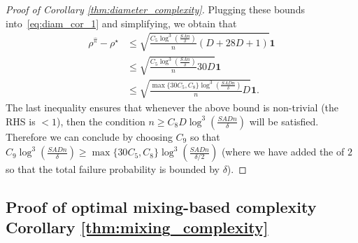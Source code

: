 \documentclass{article}
\theoremstyle{plain}
\theoremstyle{plain}
\theoremstyle{remark}
\theoremstyle{plain}
\theoremstyle{plain}
\newcommand{\one}{\mathbf{1}}
\newcommand{\pihat}{\widehat{\pi}}
\begin{document}
\begin{proof}[Proof of Corollary \ref{thm:diameter_complexity}]
    Plugging these bounds into~\eqref{eq:diam_cor_1} and simplifying, we obtain that
    \begin{align*}
        \rho^{\pihat} - \rho^\star & \leq  \sqrt{\frac{C_5 \log^3 \left( \frac{SAn}{\delta} \right)}{n} \left( D + 28 D + 1 \right) }\one \\
        & \leq  \sqrt{\frac{C_5 \log^3 \left( \frac{SAn}{\delta} \right)}{n} 30 D }\one \\
        & \leq  \sqrt{\frac{\max \{30 C_5, C_8 \} \log^3 \left( \frac{SADn}{\delta} \right)}{n}  D }\one.
    \end{align*}
    The last inequality ensures that whenever the above bound is non-trivial (the RHS is $< 1$), then the condition $n \geq C_8 D \log^3 \left(\frac{SADn}{\delta} \right)$ will be satisfied. Therefore we can conclude by choosing $C_9$ so that $C_9  \log^3 \left( \frac{SADn}{\delta} \right) \geq \max \{30 C_5, C_8 \} \log^3 \left( \frac{SADn}{\delta/2} \right)$ (where we have added the of $2$ so that the total failure probability is bounded by $\delta$).
    
\end{proof}


\subsection{Proof of optimal mixing-based complexity Corollary \ref{thm:mixing_complexity}}
\label{sec:mixing_complexity_thm_pf}
\end{document}
